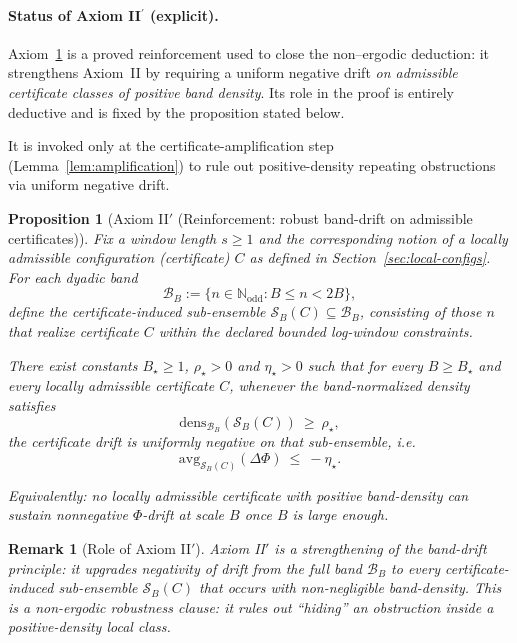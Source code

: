 \documentclass[preprint,12pt]{elsarticle}
\newtheorem{remark}{Remark}
\newtheorem{proposition}{Proposition}
\newcommand{\densB}[2]{\mathrm{dens}_{#1}\!\left(#2\right)}
\newcommand{\avgB}[2]{\mathrm{avg}_{#1}\!\left(#2\right)}
\begin{document}

\paragraph{Status of Axiom II$^\prime$ (explicit).}
Axiom~\ref{ax:IIprime_robust_drift_certificate} is a proved reinforcement used to
close the non--ergodic deduction: it strengthens Axiom~II by requiring a uniform negative
drift \emph{on admissible certificate classes of positive band density}.
Its role in the proof is entirely deductive and is fixed by the proposition stated below.

It is invoked only at the certificate-amplification step (Lemma~\ref{lem:amplification})
to rule out positive-density repeating obstructions via uniform negative drift.

\begin{proposition}[Axiom II$'$ (Reinforcement: robust band-drift on admissible certificates)]
\label{ax:IIprime_robust_drift_certificate}
Fix a window length $s\ge 1$ and the corresponding notion of a
\emph{locally admissible configuration} (certificate) $C$ as defined in
Section~\ref{sec:local-configs}.
For each dyadic band
\[
\mathcal{B}_B:=\{n\in\mathbb{N}_{\mathrm{odd}}: B\le n<2B\},
\]
define the certificate-induced sub-ensemble
\(\mathcal{S}_B(C)\subseteq\mathcal{B}_B\), consisting of those \(n\) that realize
certificate \(C\) within the declared bounded log-window constraints.

There exist constants $B_\star\ge 1$, $\rho_\star>0$ and $\eta_\star>0$ such that for every $B\ge B_\star$ and every locally admissible certificate $C$,
whenever the band-normalized density satisfies
\[
\densB{\mathcal{B}_B}{\mathcal{S}_B(C)}\ \ge\ \rho_\star,
\]
the certificate drift is uniformly negative on that sub-ensemble, i.e.
\[
\avgB{\mathcal{S}_B(C)}{\Delta\Phi}\ \le\ -\eta_\star.
\]

Equivalently: no locally admissible certificate with positive band-density can sustain nonnegative $\Phi$-drift at scale $B$ once $B$ is large enough.
\end{proposition}

\begin{remark}[Role of Axiom II$'$]
\label{rem:IIprime_role}
Axiom II$'$ is a \emph{strengthening} of the band-drift principle: it upgrades negativity of drift from the full band $\mathcal{B}_B$
to every certificate-induced sub-ensemble $\mathcal{S}_B(C)$ that occurs with non-negligible band-density.
This is a non-ergodic robustness clause: it rules out “hiding” an obstruction inside a positive-density local class.
\end{remark}
\end{document}
